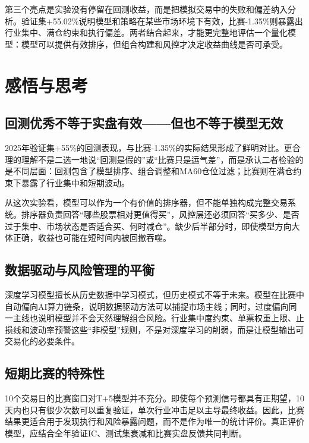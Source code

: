 \documentclass[10pt,a4paper]{ctexart}
\begin{document}
第三个亮点是实验没有停留在回测收益，而是把模拟交易中的失败和偏差纳入分析。验证集+55.02\%说明模型和策略在某些市场环境下有效，比赛-1.35\%则暴露出行业集中、满仓约束和执行偏差。两者结合起来，才能更完整地评估一个量化模型：模型可以提供有效排序，但组合构建和风控才决定收益曲线是否可承受。

\section{感悟与思考}

\subsection{回测优秀不等于实盘有效——但也不等于模型无效}

2025年验证集+55\%的回测表现，与比赛-1.35\%的实际结果形成了鲜明对比。更合理的理解不是二选一地说“回测是假的”或“比赛只是运气差”，而是承认二者检验的是不同层面：回测包含了模型排序、组合调整和MA60仓位过滤；比赛则在满仓约束下暴露了行业集中和短期波动。

从这次实验看，模型可以作为一个有价值的排序器，但不能单独构成完整交易系统。排序器负责回答“哪些股票相对更值得买”，风控层还必须回答“买多少、是否过于集中、市场状态是否适合买、何时减仓”。缺少后半部分时，即使模型方向大体正确，收益也可能在短时间内被回撤吞噬。

\subsection{数据驱动与风险管理的平衡}

深度学习模型擅长从历史数据中学习模式，但历史模式不等于未来。模型在比赛中自动偏向AI算力链条，说明数据驱动方法可以捕捉市场主线；同时，过度偏向同一主线也说明模型并不会天然理解组合风险。行业集中度约束、单票权重上限、止损线和波动率预警这些“非模型”规则，不是对深度学习的削弱，而是让模型输出可交易化的必要条件。

\subsection{短期比赛的特殊性}

10个交易日的比赛窗口对T+5模型并不充分。即使每个预测信号都具有正期望，10天内也只有很少次数可以重复验证，单次行业冲击足以主导最终收益。因此，比赛结果更适合用于发现执行和风险暴露问题，而不是作为唯一的统计评价。真正评价模型，应结合全年验证IC、测试集衰减和比赛实盘反馈共同判断。
\end{document}
